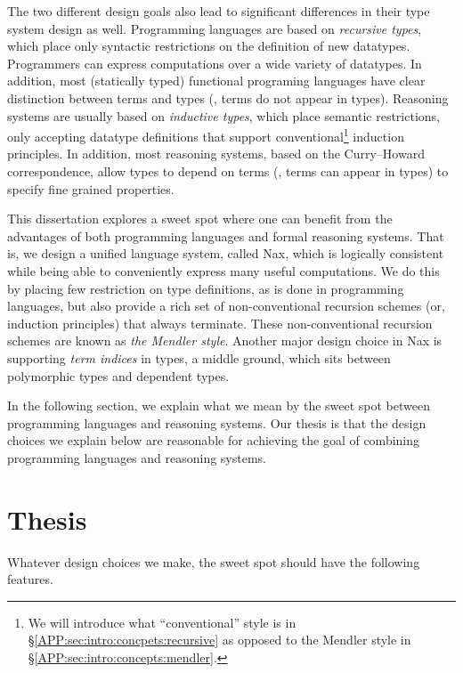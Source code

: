 The two different design goals also lead to significant differences
in their type system design as well.
Programming languages are based on \emph{recursive types},
which place only syntactic restrictions on the definition of new datatypes.
Programmers can express computations over a wide variety of datatypes.
In addition, most (statically typed) functional programing languages have
clear distinction between terms and types (\ie, terms do not appear in types).
Reasoning systems are usually based on \emph{inductive types},
which place semantic restrictions, only accepting datatype definitions
that support conventional\footnote{We will introduce
	what ``conventional'' style is in \S\ref{APP:sec:intro:concpets:recursive}
	as opposed to the Mendler style in \S\ref{APP:sec:intro:concepts:mendler}.
	} induction principles.
In addition, most reasoning systems, based on the Curry--Howard correspondence,
allow types to depend on terms (\ie, terms can appear in types) to specify
fine grained properties.

This dissertation explores a sweet spot where one can benefit from
the advantages of both programming languages and formal reasoning systems.
That is, we design a unified language system, called Nax, which is
logically consistent while being able to conveniently express
many useful computations. We do this by placing few restriction on type definitions,
as is done in programming languages, but also provide a rich set of
non-conventional recursion schemes (or, induction principles) that
always terminate. These non-conventional recursion schemes are known as
\emph{the Mendler style}. Another major design choice in Nax is
supporting \emph{term indices} in types, a middle ground, which sits between
polymorphic types and dependent types.

In the following section, we explain what we mean by the sweet spot between
programming languages and reasoning systems. Our thesis is that
the design choices we explain below are reasonable for achieving
the goal of combining programming languages and reasoning systems.

\section{Thesis}\label{APP:sec:intro:thesis}
Whatever design choices we make, the sweet spot should have the following features.

